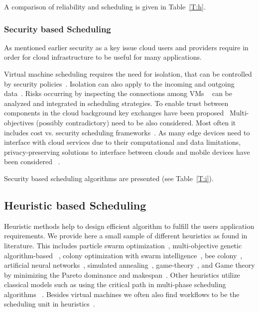 \documentclass[final,5p,times,twocolumn]{elsarticle}
\begin{document}
A comparison of reliability and scheduling is given in Table~\ref{T:h}.





\subsubsection{Security based Scheduling}\label{sec:security}



As mentioned earlier security as a key issue cloud users and
providers require in order for cloud infrastructure to be useful for
many applications.

Virtual machine scheduling requires the need for isolation, that can
be controlled by security
policies~\cite{afoulki2011security}. Isolation can also apply to the
incoming and outgoing data~\cite{chejerla2017qos,kashyap2014security}.
Risks occurring by inspecting the connections among VMs
~\cite{shetty2016security} can be analyzed and integrated in
scheduling strategies.  To enable trust between components in the
cloud background key exchanges have been proposed~\cite{liu2013ccbke}
Multi-objectives (possibly contradictory) need to be also
considered. Most often it includes cost vs. security scheduling
frameworks~\cite{kashyap2014security,zeng2015saba,wang2012cloud}.  As
many edge devices need to interface with cloud services due to their
computational and data limitations, privacy-preserving solutions to
interface between clouds and mobile devices have been considered
~\cite{bilogrevic2011meetings}.

Security based scheduling algorithms are presented (see
Table~\ref{T:i}). 





\subsection{Heuristic based Scheduling}\label{sec:heuristic}



Heuristic methods help to design efficient algorithm to fulfill the
users application requirements. We provide here a small sample of
different heuristics as found in literature. This includes particle
swarm optimization~\cite{pandey2010particle}, multi-objective genetic
algorithm-based ~\cite{mezmaz2011parallel,gkasior2016metaheuristic},
colony optimization with swarm intelligence~\cite{mateos2013aco}, bee
colony~\cite{ld2013honey}, artificial neural
networks~\cite{kousiouris2011effects}, simulated
annealing~\cite{torabzadeh2010cloud},
game-theory~\cite{gkasior2016metaheuristic}, and Game theory by
minimizing the Pareto dominance and makespan~\cite{su2013cost}.  Other
heuristics utilize classical models such as using the critical path in
multi-phase scheduling algorithms ~\cite
{abrishami2013deadline}. Besides virtual machines we often also find
workflows to be the scheduling unit in
heuristics~\cite{bousselmi2016qos}.
\end{document}
